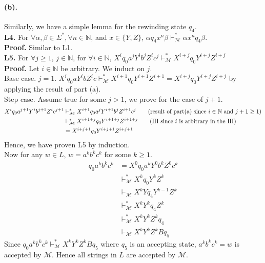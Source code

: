 \documentclass[12pt]{article}
\begin{document}
\paragraph*{(b).} Similarly, we have a simple lemma for the rewinding state \(q_4\).  \\
\textbf{L4.} For \(\forall \alpha, \beta \in \Sigma^*, \forall n \in \mathbb{N}\), and \(x \in \{Y, Z\}\), \(\alpha q_4x^n\beta \vdash^{*}_{\mathcal{M}} \alpha x^nq_4\beta\).\\
\textbf{Proof.} Similar to L1.\\
\textbf{L5.} For \(\forall j \geq 1\), \(j \in \mathbb{N}\), for \(\forall i \in \mathbb{N}\), \(X^iq_0a^jY^ib^jZ^ic^j \vdash^{*}_\mathcal{M} X^{i+j}q_0Y^{i+j}Z^{i+j}\)\\
\textbf{Proof.} Let \(i \in \mathbb{N}\) be arbitrary. We induct on \(j\).\\
Base case. \(j = 1\). \(X^iq_0aY^ibZ^ic \vdash^{*}_\mathcal{M} X^{i+1}q_0Y^{i+1}Z^{i+1} = X^{i+j}q_0Y^{i+j}Z^{i+j}\)  by applying the result of part (a).\\
Step case. Assume true for some \(j > 1\), we prove for the case of \(j+1\).
\begin{align*}
  X^iq_0a^{j+1}Y^ib^{j+1}Z^ic^{j+1} &\vdash^{*}_\mathcal{M} X^{i+1}q_0a^jY^{i+1}b^jZ^{i+1}c^j \tag*{(result of part(a) since \(i \in \mathbb{N}\) and \(j+1 \geq 1\))}\\
  &\vdash^{*}_\mathcal{M} X^{i+1+j}q_0Y^{i+1+j}Z^{i+1+j} \tag*{(IH since \(i\) is arbitrary in the IH)}\\
  &= X^{i+j+1}q_0Y^{i+j+1}Z^{i+j+1}
\end{align*}
Hence, we have proven L5 by induction.\\
Now for any \(w \in L\), \(w = a^kb^kc^k\) for some \(k \geq 1\).
\begin{align*}
  q_0a^kb^kc^k &= X^0q_0a^kY^0b^kZ^0c^k \\
  &\vdash^{*}_\mathcal{M} X^{k}q_0Y^{k}Z^{k} \tag*{(L5 by taking \(i = 0\), \(j = k\))}\\
  &\vdash_\mathcal{M} X^{k}Yq_4Y^{k-1}Z^{k} \tag*{(transition from \(q_0\) to \(q_4\))}\\
  &\vdash^{*}_\mathcal{M} X^{k}Y^kq_4Z^{k} \tag*{(L4 by taking \(x = Y\))}\\
  &\vdash^{*}_\mathcal{M} X^{k}Y^kZ^{k}q_4 \tag*{(L4 by taking \(x = Z\))}\\
  &\vdash_\mathcal{M} X^{k}Y^kZ^{k}Bq_5 \tag*{(transition from \(q_4\) to \(q_5\))}
\end{align*}
Since \(q_0a^kb^kc^k \vdash^{*}_\mathcal{M} X^{k}Y^kZ^{k}Bq_5\) where \(q_5\) is an accepting state, \(a^kb^kc^k = w\) is accepted by \(\mathcal{M}\). Hence all strings in \(L\) are accepted by \(\mathcal{M}\).
\end{document}
